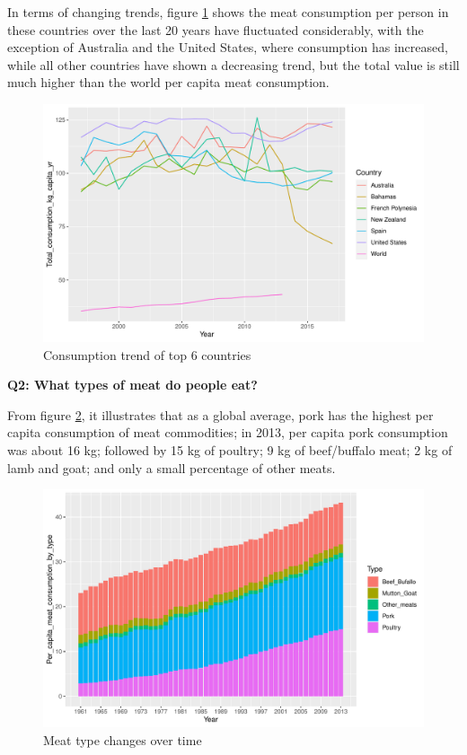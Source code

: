 \documentclass[11pt,a4paper,]{article}
\begin{document}
In terms of changing trends, figure \ref{fig:highest-consumption-trend} shows the meat consumption per person in these countries over the last 20 years have fluctuated considerably, with the exception of Australia and the United States, where consumption has increased, while all other countries have shown a decreasing trend, but the total value is still much higher than the world per capita meat consumption.

\begin{figure}
\centering
\includegraphics{report_files/figure-latex/highest-consumption-trend-1.pdf}
\caption{\label{fig:highest-consumption-trend}Consumption trend of top 6 countries}
\end{figure}

\clearpage

\textbf{Q2: What types of meat do people eat?}

From figure \ref{fig:Meat-type}, it illustrates that as a global average, pork has the highest per capita consumption of meat commodities; in 2013, per capita pork consumption was about 16 kg; followed by 15 kg of poultry; 9 kg of beef/buffalo meat; 2 kg of lamb and goat; and only a small percentage of other meats.

\begin{figure}
\centering
\includegraphics{report_files/figure-latex/Meat-type-1.pdf}
\caption{\label{fig:Meat-type}Meat type changes over time}
\end{figure}
\end{document}
